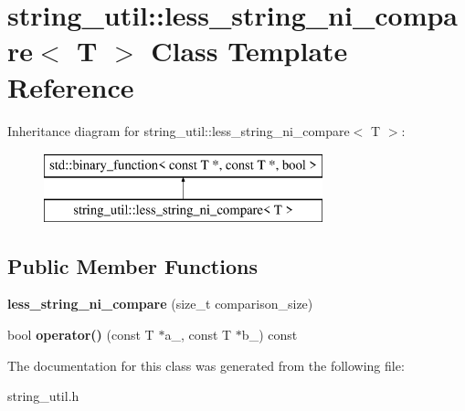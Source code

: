 \section{string\+\_\+util\+:\+:less\+\_\+string\+\_\+ni\+\_\+compare$<$ T $>$ Class Template Reference}
\label{classstring__util_1_1less__string__ni__compare}
Inheritance diagram for string\+\_\+util\+:\+:less\+\_\+string\+\_\+ni\+\_\+compare$<$ T $>$\+:\begin{figure}[H]
\begin{center}
\leavevmode
\includegraphics[height=2.000000cm]{classstring__util_1_1less__string__ni__compare}
\end{center}
\end{figure}
\subsection*{Public Member Functions}
\begin{DoxyCompactItemize}
\item 
{\bfseries less\+\_\+string\+\_\+ni\+\_\+compare} (size\+\_\+t comparison\+\_\+size)\label{classstring__util_1_1less__string__ni__compare_aec49bc79089ab2e54ff4752bbbabe6bf}

\item 
bool {\bfseries operator()} (const T $\ast$a\+\_\+, const T $\ast$b\+\_\+) const \label{classstring__util_1_1less__string__ni__compare_a6050f7d7b4998343cc5c46dca8b28bcc}

\end{DoxyCompactItemize}


The documentation for this class was generated from the following file\+:\begin{DoxyCompactItemize}
\item 
string\+\_\+util.\+h\end{DoxyCompactItemize}

